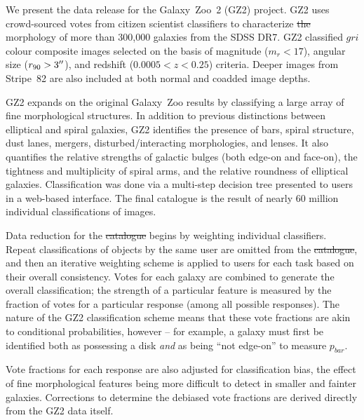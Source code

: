 \documentclass[useAMS,usenatbib]{mn2e}
\providecommand{\DIFaddtex}[1]{{\protect\color{blue}\uwave{#1}}} %
\providecommand{\DIFdeltex}[1]{{\protect\color{red}\sout{#1}}}                      %
\providecommand{\DIFaddbegin}{} %
\providecommand{\DIFaddend}{} %
\providecommand{\DIFdelbegin}{} %
\providecommand{\DIFdelend}{} %
\providecommand{\DIFadd}[1]{\texorpdfstring{\DIFaddtex{#1}}{#1}} %
\providecommand{\DIFdel}[1]{\texorpdfstring{\DIFdeltex{#1}}{}} %
\begin{document}
We present the data release for the Galaxy~Zoo~2 (GZ2) project. GZ2 uses crowd-sourced votes from citizen scientist classifiers to characterize \DIFdelbegin \DIFdel{the }\DIFdelend morphology of more than 300,000 galaxies from the SDSS DR7. GZ2 classified $gri$ colour composite images selected on the basis of magnitude ($m_r<17$), angular size ($r_{90}>3\hbox{$^{\prime\prime}$}$), and redshift ($0.0005<z<0.25$) criteria. Deeper images from Stripe~82 are also included at both normal and coadded image depths. 

GZ2 expands on the original Galaxy~Zoo results by classifying a large array of fine morphological structures. In addition to previous distinctions between elliptical and spiral galaxies, GZ2 identifies the presence of bars, spiral structure, dust lanes, mergers, disturbed/interacting morphologies, and lenses. It also quantifies the relative strengths of galactic bulges (both edge-on and face-on), the tightness and multiplicity of spiral arms, and the relative roundness of elliptical galaxies. Classification was done via a multi-step decision tree presented to users in a web-based interface. The final catalogue is the result of nearly 60 million individual classifications of images.

Data reduction for the \DIFdelbegin \DIFdel{catalogue }\DIFdelend \DIFaddbegin \DIFadd{catalog }\DIFaddend begins by weighting individual classifiers. Repeat classifications of objects by the same user are omitted from the \DIFdelbegin \DIFdel{catalogue}\DIFdelend \DIFaddbegin \DIFadd{catalog}\DIFaddend , and then an iterative weighting scheme is applied to users for each task based on their overall consistency. Votes for each galaxy are combined to generate the overall classification; the strength of a particular feature is measured by the fraction of votes for a particular response (among all possible responses). The nature of the GZ2 classification scheme means that these vote fractions are akin to conditional probabilities, however -- for example, a galaxy must first be identified both as possessing a disk {\em and} as being ``not edge-on'' to measure \DIFdelbegin \DIFdel{$p_{bar}$}\DIFdelend \DIFaddbegin \DIFadd{$p_\mathrm{bar}$}\DIFaddend .

Vote fractions for each response are also adjusted for classification bias, the effect of fine morphological features being more difficult to detect in smaller and fainter galaxies. Corrections to determine the debiased vote fractions are derived directly from the GZ2 data itself. 
\end{document}
